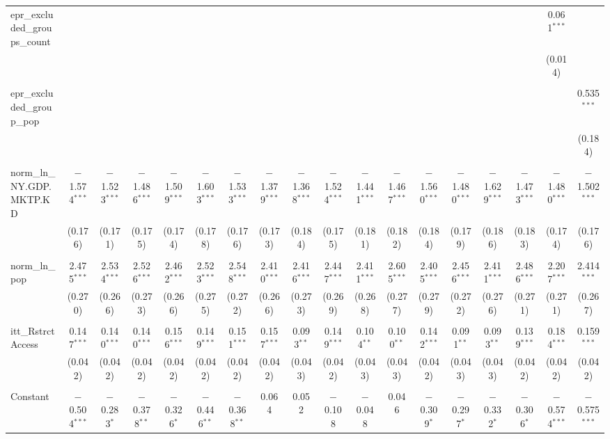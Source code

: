 \begin{table}[!htbp]
\begin{tabular}{@{\extracolsep{5pt}}lccccccccccccccccc}
 epr\_excluded\_groups\_count &  &  &  &  &  &  &  &  &  &  &  &  &  &  &  & 0.061$^{***}$ &  \\ 
  &  &  &  &  &  &  &  &  &  &  &  &  &  &  &  & (0.014) &  \\ 
  & & & & & & & & & & & & & & & & & \\ 
 epr\_excluded\_group\_pop &  &  &  &  &  &  &  &  &  &  &  &  &  &  &  &  & 0.535$^{***}$ \\ 
  &  &  &  &  &  &  &  &  &  &  &  &  &  &  &  &  & (0.184) \\ 
  & & & & & & & & & & & & & & & & & \\ 
 norm\_ln\_NY.GDP.MKTP.KD & $-$1.574$^{***}$ & $-$1.523$^{***}$ & $-$1.486$^{***}$ & $-$1.509$^{***}$ & $-$1.603$^{***}$ & $-$1.533$^{***}$ & $-$1.379$^{***}$ & $-$1.368$^{***}$ & $-$1.524$^{***}$ & $-$1.441$^{***}$ & $-$1.467$^{***}$ & $-$1.560$^{***}$ & $-$1.480$^{***}$ & $-$1.629$^{***}$ & $-$1.473$^{***}$ & $-$1.480$^{***}$ & $-$1.502$^{***}$ \\ 
  & (0.176) & (0.171) & (0.175) & (0.174) & (0.178) & (0.176) & (0.173) & (0.184) & (0.175) & (0.181) & (0.182) & (0.184) & (0.179) & (0.186) & (0.183) & (0.174) & (0.176) \\ 
  & & & & & & & & & & & & & & & & & \\ 
 norm\_ln\_pop & 2.475$^{***}$ & 2.534$^{***}$ & 2.526$^{***}$ & 2.462$^{***}$ & 2.523$^{***}$ & 2.548$^{***}$ & 2.410$^{***}$ & 2.416$^{***}$ & 2.447$^{***}$ & 2.411$^{***}$ & 2.605$^{***}$ & 2.405$^{***}$ & 2.456$^{***}$ & 2.411$^{***}$ & 2.486$^{***}$ & 2.207$^{***}$ & 2.414$^{***}$ \\ 
  & (0.270) & (0.266) & (0.273) & (0.266) & (0.275) & (0.272) & (0.266) & (0.273) & (0.269) & (0.268) & (0.277) & (0.279) & (0.272) & (0.276) & (0.271) & (0.271) & (0.267) \\ 
  & & & & & & & & & & & & & & & & & \\ 
 itt\_RstrctAccess & 0.147$^{***}$ & 0.140$^{***}$ & 0.140$^{***}$ & 0.156$^{***}$ & 0.149$^{***}$ & 0.151$^{***}$ & 0.157$^{***}$ & 0.093$^{**}$ & 0.149$^{***}$ & 0.104$^{**}$ & 0.100$^{**}$ & 0.142$^{***}$ & 0.091$^{**}$ & 0.093$^{**}$ & 0.139$^{***}$ & 0.184$^{***}$ & 0.159$^{***}$ \\ 
  & (0.042) & (0.042) & (0.042) & (0.042) & (0.042) & (0.042) & (0.042) & (0.043) & (0.042) & (0.043) & (0.043) & (0.042) & (0.043) & (0.043) & (0.042) & (0.042) & (0.042) \\ 
  & & & & & & & & & & & & & & & & & \\ 
 Constant & $-$0.504$^{***}$ & $-$0.283$^{*}$ & $-$0.378$^{**}$ & $-$0.326$^{*}$ & $-$0.446$^{**}$ & $-$0.368$^{**}$ & 0.064 & 0.052 & $-$0.108 & $-$0.048 & 0.046 & $-$0.309$^{*}$ & $-$0.297$^{*}$ & $-$0.332$^{*}$ & $-$0.306$^{*}$ & $-$0.574$^{***}$ & $-$0.575$^{***}$ \\ 

\end{tabular}
\end{table}

